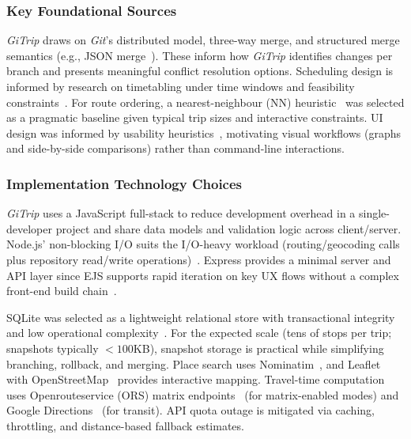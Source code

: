 \subsubsection{Key Foundational Sources}
\textit{GiTrip} draws on \textit{Git}'s distributed model, three-way merge, and structured merge semantics (e.g., JSON merge~\cite{json-merge-patch}). These inform how \textit{GiTrip} identifies changes per branch and presents meaningful conflict resolution options. Scheduling design is informed by research on timetabling under time windows and feasibility constraints~\cite{timetable-scheduling}. For route ordering, a nearest-neighbour (NN) heuristic~\cite{hougardy-nn} was selected as a pragmatic baseline given typical trip sizes and interactive constraints. UI design was informed by usability heuristics~\cite{nielsen-usability}, motivating visual workflows (graphs and side-by-side comparisons) rather than command-line interactions.

\subsubsection{Implementation Technology Choices}
\textit{GiTrip} uses a JavaScript full-stack to reduce development overhead in a single-developer project and share data models and validation logic across client/server. Node.js' non-blocking I/O suits the I/O-heavy workload (routing/geocoding calls plus repository read/write operations)~\cite{nodejs}. Express provides a minimal server and API layer since EJS supports rapid iteration on key UX flows without a complex front-end build chain~\cite{express}.

SQLite was selected as a lightweight relational store with transactional integrity and low operational complexity~\cite{sqlite}. For the expected scale (tens of stops per trip; snapshots typically $<100$KB), snapshot storage is practical while simplifying branching, rollback, and merging. Place search uses Nominatim~\cite{nominatim}, and Leaflet~\cite{leaflet} with OpenStreetMap~\cite{osm} provides interactive mapping. Travel-time computation uses Openrouteservice (ORS) matrix endpoints~\cite{ors-matrix} (for matrix-enabled modes) and Google Directions~\cite{google-directions} (for transit). API quota outage is mitigated via caching, throttling, and distance-based fallback estimates.